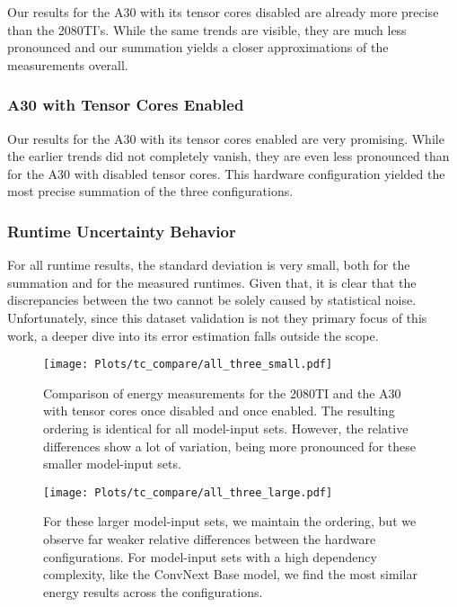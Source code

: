 Our results for the A30 with its tensor cores disabled are already more precise than the 2080TI's. While the same trends are visible, they are much less pronounced and our summation yields a closer approximations of the measurements overall. 


\subsubsection{A30 with Tensor Cores Enabled}
Our results for the A30 with its tensor cores enabled are very promising. While the earlier trends did not completely vanish, they are even less pronounced than for the A30 with disabled tensor cores. This hardware configuration yielded the most precise summation of the three configurations.

\subsubsection{Runtime Uncertainty Behavior}
For all runtime results, the standard deviation is very small, both for the summation and for the measured runtimes. Given that, it is clear that the discrepancies between the two cannot be solely caused by statistical noise. \\
Unfortunately, since this dataset validation is not they primary focus of this work, a deeper dive into its error estimation falls outside the scope.

\begin{figure}
    \center\texttt{[image: Plots/tc\_compare/all\_three\_small.pdf]}
    \caption{Comparison of energy measurements for the 2080TI and the A30 with tensor cores once disabled and once enabled. The resulting ordering is identical for all model-input sets. However, the relative differences show a lot of variation, being more pronounced for these smaller model-input sets.}
    \label{fig:tcnotcsmall}
    \texttt{[image: Plots/tc\_compare/all\_three\_large.pdf]}
    \caption{For these larger model-input sets, we maintain the ordering, but we observe far weaker relative differences between the hardware configurations. For model-input sets with a high dependency complexity, like the ConvNext Base model, we find the most similar energy results across the configurations.}
    \label{fig:tcnotclarge}
\end{figure}


\setcounter{savedpage}{\value{page}}


